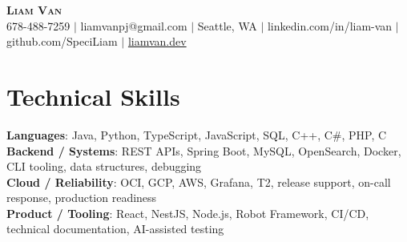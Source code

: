 \documentclass[letterpaper,11pt]{article}
\begin{document}

%
\begin{center}
    \textbf{\Huge \scshape Liam Van} \\ \vspace{1pt}
    \small 678-488-7259 $|$ \small {liamvanpj@gmail.com} $|$ Seattle, WA
 {{$|$ linkedin.com/in/liam-van} {$|$ github.com/SpeciLiam} {$|$ \href{https://liamvan.dev}{liamvan.dev}}}

\end{center}

\section{Technical Skills}
 \begin{itemize}[leftmargin=0.15in, label={}]
    \small{\item{
     \textbf{Languages}{: Java, Python, TypeScript, JavaScript, SQL, C++, C\#, PHP, C} \\
     \textbf{Backend / Systems}{: REST APIs, Spring Boot, MySQL, OpenSearch, Docker, CLI tooling, data structures, debugging} \\
     \textbf{Cloud / Reliability}{: OCI, GCP, AWS, Grafana, T2, release support, on-call response, production readiness} \\
     \textbf{Product / Tooling}{: React, NestJS, Node.js, Robot Framework, CI/CD, technical documentation, AI-assisted testing} \\
    }}
 \end{itemize}
%

\end{document}
